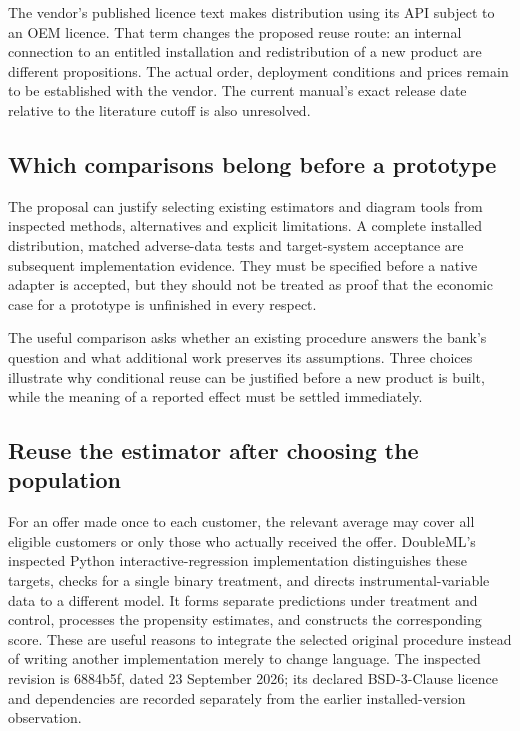 The vendor's published licence text makes distribution using its API subject
to an OEM licence. That term changes the proposed reuse route: an internal
connection to an entitled installation and redistribution of a new product
are different propositions. The actual order, deployment conditions and
prices remain to be established with the vendor. The current manual's exact
release date relative to the literature cutoff is also unresolved.
\citep{gap29huginlicense}

\subsection{Which comparisons belong before a prototype}
The proposal can justify selecting existing estimators and diagram tools
from inspected methods, alternatives and explicit limitations. A complete
installed distribution, matched adverse-data tests and target-system
acceptance are subsequent implementation evidence. They must be specified
before a native adapter is accepted, but they should not be treated as
proof that the economic case for a prototype is unfinished in every respect.

The useful comparison asks whether an existing procedure answers the bank's
question and what additional work preserves its assumptions. Three choices
illustrate why conditional reuse can be justified before a new product is
built, while the meaning of a reported effect must be settled immediately.

\subsection{Reuse the estimator after choosing the population}
For an offer made once to each customer, the relevant average may cover all
eligible customers or only those who actually received the offer. DoubleML's
inspected Python interactive-regression implementation distinguishes these
targets, checks for a single binary treatment, and directs instrumental-variable
data to a different model. It forms separate predictions under treatment and
control, processes the propensity estimates, and constructs the corresponding
score. These are useful reasons to integrate the selected original procedure
instead of writing another implementation merely to change language.
The inspected revision is 6884b5f, dated 23 September 2026; its declared
BSD-3-Clause licence and dependencies are recorded separately from the earlier
installed-version observation. \citep{exec23_doubleml_reuse_source}

